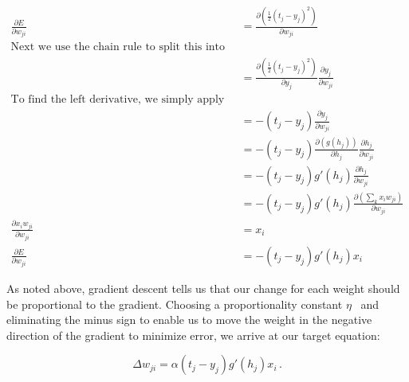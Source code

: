 \begin{align*}
\frac{\partial E}{ \partial w_{ji} } &= \frac{ \partial \left ( \frac{1}{2} \left( t_j-y_j \right ) ^2 \right ) }{ \partial w_{ji} } \\
\text{Next we use the chain rule to split this into two derivatives}  \\
									 &= \frac{ \partial \left ( \frac{1}{2} \left( t_j-y_j \right ) ^2 \right ) }{ \partial y_j } \frac{ \partial y_j }{ \partial w_{ji} } \\
\text{To find the left derivative, we simply apply the general power rule}  \\									 
									 &= - \left ( t_j-y_j \right ) \frac{ \partial y_j }{ \partial w_{ji} }  \\
									 &= - \left ( t_j-y_j \right ) \frac{ \partial (g(h_j)) }{ \partial h_j } \frac{ \partial h_j }{ \partial w_{ji} } \\
									 &= - \left ( t_j-y_j \right ) g'(h_j) \frac{ \partial h_j }{ \partial w_{ji} } \\
									 &= - \left ( t_j-y_j \right ) g'(h_j) \frac{ \partial \left ( \sum_{k} x_i w_{ji} \right ) }{ \partial w_{ji} } \\
\frac{ \partial x_i w_{ji} }{ \partial w_{ji} } &= x_i \\
\frac{\partial E}{ \partial w_{ji} } &= - \left ( t_j-y_j \right ) g'(h_j) x_i \,
\end{align*}

As noted above, gradient descent tells us that our change for each weight should be proportional to the gradient. Choosing a proportionality constant $\eta$ \, and eliminating the minus sign to enable us to move the weight in the negative direction of the gradient to minimize error, we arrive at our target equation:

\[
\Delta w_{ji}=\alpha(t_j-y_j) g'(h_j) x_i \,.
\]
